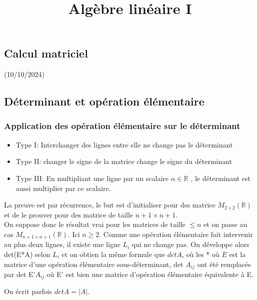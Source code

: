 \documentclass[11pt]{book}
\begin{document}
\setcounter{section}{8}
\title{Algèbre linéaire I}
\maketitle
\thispagestyle{empty}

\begin{center}
\chapter{Calcul matriciel}
\begin{framedate}
    (10/10/2024)
\end{framedate}
\end{center}
\section{Déterminant et opération élémentaire}
\subsection{Application des opération élémentaire sur le déterminant}
\begin{itemize}
    \item Type I: Interchanger des lignes entre elle ne change pas le déterminant
    \item Type II: changer le signe de la matrice change le signe du déterminant
    \item Type III: En multipliant une ligne par un scalaire $\alpha \in \mathbb{R}$ , le déterminant est aussi multiplier par ce scalaire.

     
\end{itemize}

La preuve est par récurrence, le but est d'initialiser pour des matrice $M_{2\times 2}(\mathbb{R})$ et de le prouver pour des matrice de taille $n+1\times n+1$. 
\\
On suppose donc le résultat vrai pour les matrices de taille $\leq n$ et on passe au cas $M_{n+1\times n+1}(\mathbb{R})$. Ici $n \geq 2$. Comme une opération élémentaire fait intervenir au plus deux lignes, il existe une ligne $L_i$ qui ne change pas. On développe alors det(E*A) selon $L_i$ et on obtien la même formule que $det A$, où les * où $E$ est la matrice d'une opération élémentaire sous-déterminant, det $A_{ij}$ ont été remplacés par det E'$A_{ij}$ où E' est bien une matrice d'opération élémentaire équivalente à E.
\begin{framedremark}
    On écrit parfois $det A = |A|$.
\end{framedremark}
    
\end{document}
